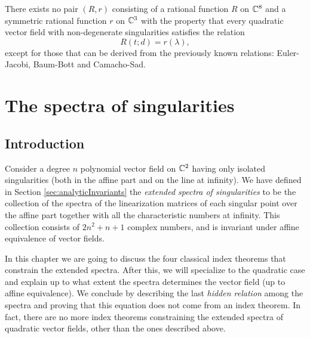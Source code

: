 \documentclass[phd,tocprelim]{cornell}
\begin{document}
\begin{theorem}\label{thm:noIndexTheorem}
 There exists no pair $(R,r)$ consisting of a rational function $R$ on $\mathbb{C}^8$ and a symmetric rational function $r$ on $\mathbb{C}^3$ with the property that every quadratic vector field with non-degenerate singularities satisfies the relation
  \begin{equation}
   R(t;d)=r(\lambda), 
  \end{equation}
 except for those that can be derived from the previously known relations: Euler-Jacobi, Baum-Bott and Camacho-Sad.
\end{theorem}










\chapter{The spectra of singularities}

\section{Introduction}

Consider a degree $n$ polynomial vector field on $\mathbb{C}^2$ having only isolated singularities (both in the affine part and on the line at infinity). We have defined in Section \ref{sec:analyticInvariants} the \textit{extended spectra of singularities} to be the collection of the spectra of the linearization matrices of each singular point over the affine part together with all the characteristic numbers at infinity. This collection consists of $2n^2+n+1$ complex numbers, and is invariant under affine equivalence of vector fields.

In this chapter we are going to discuss the four classical index theorems that constrain the extended spectra. After this, we will specialize to the quadratic case and explain up to what extent the spectra determines the vector field (up to affine equivalence). We conclude by describing the last \textit{hidden relation} among the spectra and proving that this equation does not come from an index theorem. In fact, there are no more index theorems constraining the extended spectra of quadratic vector fields, other than the ones described above.


\end{document}
